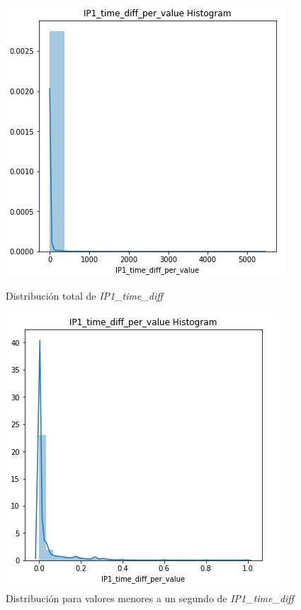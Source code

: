 \begin{figure}[H]
   \begin{minipage}{0.48\textwidth}
     \centering
     \includegraphics[width=0.8\linewidth]{figs/ip1diff_1.PNG}
     \caption{Distribución total de \textit{IP1\_time\_diff}}
     \label{Fig:ip1_diff1}
   \end{minipage}\hfill
   \begin{minipage}{0.48\textwidth}
     \centering
     \includegraphics[width=0.8\linewidth]{figs/ip1diff_2.PNG}
     \caption{Distribución para valores menores a un segundo de \textit{IP1\_time\_diff} }
     \label{Fig:ip1_diff2}
   \end{minipage}
\end{figure}

